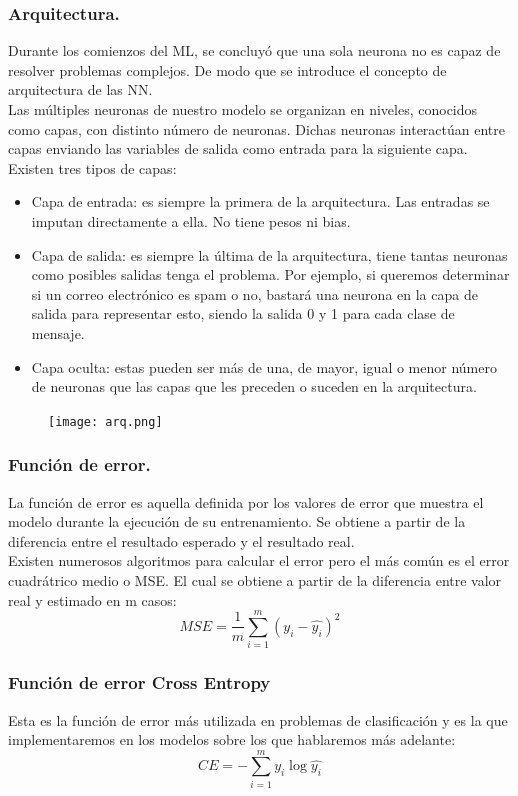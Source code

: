 \documentclass[a4paper,10pt]{article}
\begin{document}
\subsubsection{Arquitectura.}
Durante los comienzos del ML, se concluyó que una sola neurona no es capaz de resolver problemas complejos. De modo que se introduce el concepto de arquitectura de las NN.\\
Las múltiples neuronas de nuestro modelo se organizan en niveles, conocidos como capas, con distinto número de neuronas. Dichas neuronas interactúan entre capas enviando las variables de salida como entrada para la siguiente capa.
Existen tres tipos de capas:
\begin{itemize}
    \item Capa de entrada: es siempre la primera de la arquitectura. Las entradas se imputan directamente a ella. No tiene pesos ni bias.
    \item Capa de salida: es siempre la última de la arquitectura, tiene tantas neuronas como posibles salidas tenga el problema. Por ejemplo, si queremos determinar si un correo electrónico es spam o no, bastará una neurona en la capa de salida para representar esto, siendo la salida 0 y 1 para cada clase de mensaje. 
    \item Capa oculta: estas pueden ser más de una, de mayor, igual o menor número de neuronas que las capas que les preceden o suceden en la arquitectura.
\end{itemize} 
\begin{figure}[H]
\centering
\texttt{[image: arq.png]}
\end{figure}
\subsubsection{Función de error.}
La función de error es aquella definida por los valores de error que muestra el modelo durante la ejecución de su entrenamiento. Se obtiene a partir de la diferencia entre el resultado esperado y el resultado real.\\ Existen numerosos algoritmos para calcular el error pero el más común es el error cuadrátrico medio o MSE. El cual se obtiene a partir de la diferencia entre valor real y estimado en m casos:
\[
MSE=\frac{1}{m}\sum_{i=1}^m (y_i - \hat{y_i})^2
\]
\subsubsection{Función de error Cross Entropy}
Esta es la función de error más utilizada en problemas de clasificación y es la que implementaremos en los modelos sobre los que hablaremos más adelante: 
\[
CE=-\sum_{i=1}^m y_i \log\hat{y_i}
\]
\end{document}
